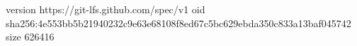 version https://git-lfs.github.com/spec/v1
oid sha256:4e553bb5b21940232c9e63e68108f8ed67c5bc629ebda350c833a13baf045742
size 626416
